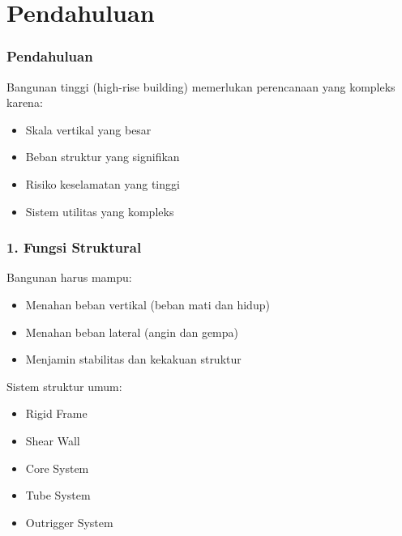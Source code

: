 \documentclass[../skb.tex]{subfiles}
\begin{document}
\section{Pendahuluan}%
\label{sec:Pendahuluan}


\begin{frame}[t,mybg=pg_1,mytitle=standard,dark]
\end{frame}

\begin{frame}[t,mybg=pg_2,mytitle=standard,dark]
\end{frame}

\begin{frame}[t,mycolor=digiPH_leaf,mytitle=standard,dark]
	\frametitle{Pendahuluan}

	Bangunan tinggi (high-rise building) memerlukan perencanaan yang kompleks karena:

	\begin{itemize}
		\item Skala vertikal yang besar
		\item Beban struktur yang signifikan
		\item Risiko keselamatan yang tinggi
		\item Sistem utilitas yang kompleks
	\end{itemize}

\end{frame}

\begin{frame}[t,mycolor=digiPH_leaf,mytitle=standard,dark]
	\frametitle{1. Fungsi Struktural}

	Bangunan harus mampu:

	\begin{itemize}
		\item Menahan beban vertikal (beban mati dan hidup)
		\item Menahan beban lateral (angin dan gempa)
		\item Menjamin stabilitas dan kekakuan struktur
	\end{itemize}

	Sistem struktur umum:
	\begin{itemize}
		\item Rigid Frame
		\item Shear Wall
		\item Core System
		\item Tube System
		\item Outrigger System
	\end{itemize}

\end{frame}
\end{document}
